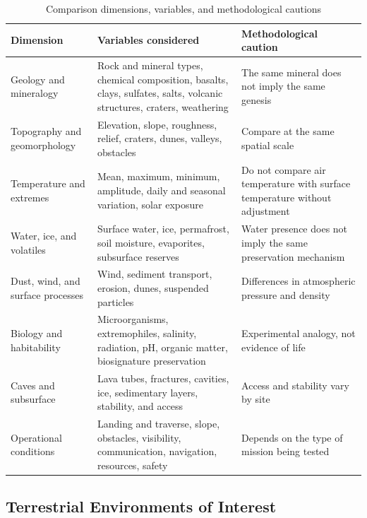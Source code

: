 \documentclass[12pt,letterpaper]{article}
\begin{document}
\begin{table}[htbp]
\centering
\caption{Comparison dimensions, variables, and methodological cautions}
\small
\begin{tabularx}{\textwidth}{>{\raggedright\arraybackslash}p{3.2cm} >{\raggedright\arraybackslash}X >{\raggedright\arraybackslash}p{4.2cm}}
\toprule
\textbf{Dimension} & \textbf{Variables considered} & \textbf{Methodological caution} \\
\midrule
Geology and mineralogy & Rock and mineral types, chemical composition, basalts, clays, sulfates, salts, volcanic structures, craters, weathering & The same mineral does not imply the same genesis \\
Topography and geomorphology & Elevation, slope, roughness, relief, craters, dunes, valleys, obstacles & Compare at the same spatial scale \\
Temperature and extremes & Mean, maximum, minimum, amplitude, daily and seasonal variation, solar exposure & Do not compare air temperature with surface temperature without adjustment \\
Water, ice, and volatiles & Surface water, ice, permafrost, soil moisture, evaporites, subsurface reserves & Water presence does not imply the same preservation mechanism \\
Dust, wind, and surface processes & Wind, sediment transport, erosion, dunes, suspended particles & Differences in atmospheric pressure and density \\
Biology and habitability & Microorganisms, extremophiles, salinity, radiation, pH, organic matter, biosignature preservation & Experimental analogy, not evidence of life \\
Caves and subsurface & Lava tubes, fractures, cavities, ice, sedimentary layers, stability, and access & Access and stability vary by site \\
Operational conditions & Landing and traverse, slope, obstacles, visibility, communication, navigation, resources, safety & Depends on the type of mission being tested \\
\bottomrule
\end{tabularx}
\end{table}

\subsection{Terrestrial Environments of Interest}
\end{document}
